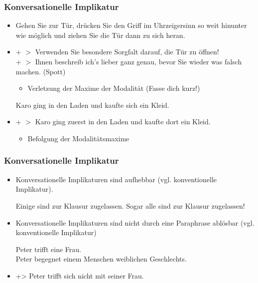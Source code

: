 \begin{frame}
\frametitle{Konversationelle Implikatur}

\begin{itemize}
	\item[]
	
	\ea Gehen Sie zur Tür, drücken Sie den Griff im Uhrzeigersinn so weit hinunter wie möglich und ziehen Sie die Tür dann zu sich heran.
	\z

	\item[] + $>$ Verwenden Sie besondere Sorgfalt darauf, die Tür zu öffnen!\\
+ $>$ Ihnen beschreib ich's lieber ganz genau, bevor Sie wieder was falsch machen. (Spott)

	\begin{itemize}
		\item Verletzung der Maxime der Modalität (Fasse dich kurz!)
	\end{itemize}
	
\vspace{1ex}
	
	\ea Karo ging in den Laden und kaufte sich ein Kleid.
	\z

	\item[] + $>$ Karo ging zuerst in den Laden und kaufte dort ein Kleid.

	\begin{itemize}
		\item Befolgung der Modalitätsmaxime
	\end{itemize}
	
\end{itemize}

\end{frame}



\begin{frame}
\frametitle{Konversationelle Implikatur}

\begin{itemize}
	\item Konversationelle Implikaturen sind aufhebbar (vgl. konventionelle Implikatur).
	
		\ea Einige sind zur Klausur zugelassen. Sogar alle sind zur Klausur zugelassen!
		\z
	
	\item Konversationelle Implikaturen sind nicht durch eine Paraphrase ablösbar (vgl. konventionelle Implikatur)
	
	\ea Peter trifft eine Frau.\\
Peter begegnet einem Menschen weiblichen Geschlechts.
	\z

	\item[] +> Peter trifft sich nicht mit seiner Frau.
	
\end{itemize}

\end{frame}


